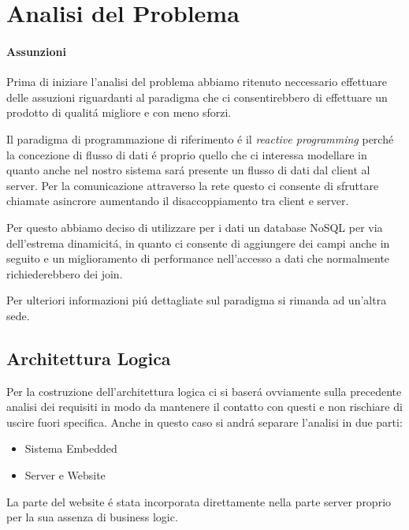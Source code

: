 \section{Analisi del Problema}

\paragraph{Assunzioni}
Prima di iniziare l'analisi del problema abbiamo ritenuto neccessario effettuare delle assuzioni riguardanti al paradigma che ci consentirebbero di effettuare un prodotto di qualit\'a migliore e con meno sforzi.

Il paradigma di programmazione di riferimento \'e il \textit{reactive programming} perch\'e la concezione di flusso di dati \'e proprio quello che ci interessa modellare in quanto anche nel nostro sistema sar\'a presente un flusso di dati dal client al server. Per la comunicazione attraverso la rete questo ci consente di sfruttare chiamate asincrore aumentando il disaccoppiamento tra client e server.

Per questo abbiamo deciso di utilizzare per i dati un database NoSQL per via dell'estrema dinamicit\'a, in quanto ci consente di aggiungere dei campi anche in seguito e un miglioramento di performance nell'accesso a dati che normalmente richiederebbero dei join.

Per ulteriori informazioni pi\'u dettagliate sul paradigma si rimanda ad un'altra sede. 

\subsection{Architettura Logica}

Per la costruzione dell'architettura logica ci si baser\'a ovviamente sulla precedente analisi dei requisiti in modo da mantenere il contatto con questi e non rischiare di uscire fuori specifica. Anche in questo caso si andr\'a separare l'analisi in due parti:

\begin{itemize}
\item Sistema Embedded
\item Server e Website
\end{itemize}

La parte del website \'e stata incorporata direttamente nella parte server proprio per la sua assenza di business logic.

